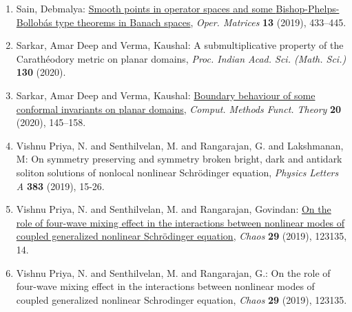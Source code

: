 \begin{enumerate}[resume, leftmargin=27pt]
	\item Sain, Debmalya: \href{https://doi.org/10.7153/oam-2019-13-32}{Smooth points in operator spaces and some
		      {B}ishop-{P}helps-{B}ollob\'{a}s type theorems in {B}anach spaces}, \emph{Oper. Matrices} {\bf 13} (2019), 433--445.

	\item Sarkar, Amar Deep and Verma, Kaushal: A submultiplicative property of the Carath\'{e}odory metric on planar domains, \emph{Proc. Indian Acad. Sci. (Math. Sci.)} {\bf 130} (2020).

	\item Sarkar, Amar Deep and Verma, Kaushal: \href{https://doi.org/10.1007/s40315-020-00303-2}{Boundary behaviour of some conformal invariants on planar
		      domains}, \emph{Comput. Methods Funct. Theory} {\bf 20} (2020), 145--158.

	\item Vishnu Priya, N. and Senthilvelan, M. and  Rangarajan, G. and Lakshmanan, M: On symmetry preserving and symmetry broken bright, dark and antidark soliton solutions of nonlocal nonlinear Schrödinger equation, \emph{Physics Letters A} {\bf 383} (2019), 15-26.

	\item Vishnu Priya, N. and Senthilvelan, M. and Rangarajan,
	      Govindan: \href{https://doi.org/10.1063/1.5121245}{On the role of four-wave mixing effect in the interactions
	      between nonlinear modes of coupled generalized nonlinear
		      {S}chr\"{o}dinger equation}, \emph{Chaos} {\bf 29} (2019), 123135, 14.

	\item Vishnu Priya, N. and Senthilvelan, M. and Rangarajan, G.: On the role of four-wave mixing effect in the interactions between nonlinear modes of coupled generalized nonlinear Schrodinger equation, \emph{Chaos} {\bf 29} (2019), 123135.\end{enumerate}


\vspace{-2.5mm}

